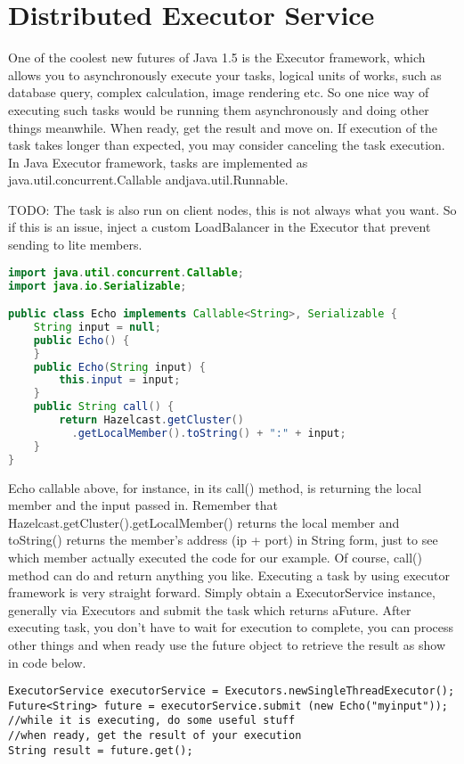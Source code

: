 \chapter{Distributed Executor Service}

One of the coolest new futures of Java 1.5 is the Executor framework, which allows you to asynchronously execute your tasks, logical units of works, such as database query, complex calculation, image rendering etc. So one nice way of executing such tasks would be running them asynchronously and doing other things meanwhile. When ready, get the result and move on. If execution of the task takes longer than expected, you may consider canceling the task execution. In Java Executor framework, tasks are implemented as java.util.concurrent.Callable andjava.util.Runnable.

TODO: The task is also run on client nodes, this is not always what you want. So if this is an issue, inject a custom LoadBalancer in the Executor that prevent sending to lite members.

\begin{lstlisting}[language=java]
import java.util.concurrent.Callable;
import java.io.Serializable;

public class Echo implements Callable<String>, Serializable {
    String input = null;
    public Echo() {
    }
    public Echo(String input) {
        this.input = input;
    }
    public String call() {
        return Hazelcast.getCluster()
          .getLocalMember().toString() + ":" + input;
    }
}
\end{lstlisting}

Echo callable above, for instance, in its call() method, is returning the local member and the input passed in. Remember that Hazelcast.getCluster().getLocalMember() returns the local member and toString() returns the member's address (ip + port) in String form, just to see which member actually executed the code for our example. Of course, call() method can do and return anything you like. Executing a task by using executor framework is very straight forward. Simply obtain a ExecutorService instance, generally via Executors and submit the task which returns aFuture. After executing task, you don't have to wait for execution to complete, you can process other things and when ready use the future object to retrieve the result as show in code below.

\begin{verbatim}
ExecutorService executorService = Executors.newSingleThreadExecutor();
Future<String> future = executorService.submit (new Echo("myinput"));
//while it is executing, do some useful stuff
//when ready, get the result of your execution
String result = future.get();
\end{verbatim}


